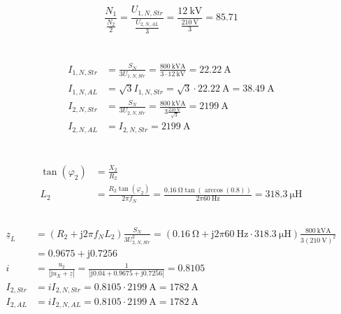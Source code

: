 \documentclass[11pt,a4paper]{scrartcl}
\newcommand{\mybr}[1]{\left(#1\right)}
\renewcommand{\j}{\mathrm{j}}
\newcommand{\z}{\underline{z}}
\newcommand{\0}{_{\mybr{0}}}
\newcommand{\1}{_{\mybr{1}}}
\newcommand{\2}{_{\mybr{2}}}
\newcommand{\ISS}{I_{2,Str}}
\newcommand{\ISA}{I_{2,AL}}
\newcommand{\UPNS}{U_{1,N,Str}}
\newcommand{\USNS}{U_{2,N,Str}}
\newcommand{\USNA}{U_{2,N,AL}}
\newcommand{\IPNS}{I_{1,N,Str}}
\newcommand{\ISNS}{I_{2,N,Str}}
\newcommand{\IPNA}{I_{1,N,AL}}
\newcommand{\ISNA}{I_{2,N,AL}}
\begin{document}
\section{}
\begin{equation}
\frac{N_1}{\frac{N_2}{2}}=\frac{\UPNS}{\frac{\USNA}{3}}=\frac{\SI{12}{\kilo\volt}}{\frac{\SI{210}{\volt}}{3}}=\num{85.71}
\end{equation}

\section{}
\begin{align}
\IPNS&=\frac{S_N}{3\UPNS}=\frac{\SI{800}{\kilo\volt\ampere}}{3\cdot\SI{12}{\kilo\volt}}=\SI{22.22}{\ampere}\\
\IPNA&=\sqrt{3}\IPNS=\sqrt{3}\cdot\SI{22.22}{\ampere}=\SI{38.49}{\ampere}\\
\ISNS&=\frac{S_N}{3\USNS}=\frac{\SI{800}{\kilo\volt\ampere}}{3\frac{\SI{210}{\volt}}{\sqrt{3}}}=\SI{2199}{\ampere}\\
\ISNA&=\ISNS=\SI{2199}{\ampere}
\end{align}

\section{}
\subsection{}
\begin{align}
\tan\mybr{\varphi_2}&=\frac{X_2}{R_2}\\
L_2&=\frac{R_2\tan\mybr{\varphi_2}}{2\pi f_N}=\frac{\SI{0.16}{\ohm}\tan\mybr{\arccos\mybr{0.8}}}
{2\pi\SI{60}{\hertz}}=\SI{318.3}{\micro\henry}
\end{align}

\subsection{}
\begin{align}
\z_L&=\mybr{R_2+\j 2\pi f_N L_2}\frac{S_N}{3\USNS^2}=\mybr{\SI{0.16}{\ohm}+\j2\pi\SI{60}{\hertz}\cdot\SI{318.3}{\micro\henry}}\frac{\SI{800}{\kilo\volt\ampere}}{3\mybr{\SI{210}{\volt}}^2}\\
&=\num{0.9675}+\j\num{0.7256}\label{eq:alterWiderstand}\\
i&=\frac{u_2}{\left|\j u_X+\z\right|}=\frac{1}{\left|\j\num{0.04}+\num{0.9675}+\j\num{0.7256}\right|}=\num{0.8105}\\
\ISS&=i\ISNS=\num{0.8105}\cdot\SI{2199}{\ampere}=\SI{1782}{\ampere}\\
\ISA&=i\ISNA=\num{0.8105}\cdot\SI{2199}{\ampere}=\SI{1782}{\ampere}
\end{align}
\end{document}

